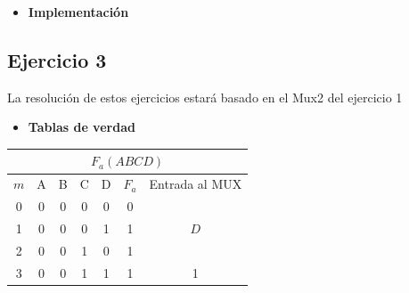 \begin{itemize}[nosep]\item\textbf{Implementación}\end{itemize}
\newpage
\subsection{Ejercicio 3}
\sangria{} La resolución de estos ejercicios estará basado en el Mux2 del ejercicio 1
\begin{itemize}[nosep]\item\textbf{Tablas de verdad}\end{itemize}
\begin{center}
    \begin{minipage}[t]{0.45\textwidth}\centering
        \begin{tabular}{ccccccc}
\multicolumn{7}{c}{\cellcolor[HTML]{FFFFC7}$F_a(ABCD)$}                                                                                                                                                                                                                       \\ \hline
\multicolumn{1}{c|}{\cellcolor[HTML]{9AFF99}$m$} & \cellcolor[HTML]{ECF4FF}A & \cellcolor[HTML]{ECF4FF}B & \cellcolor[HTML]{ECF4FF}C & \multicolumn{1}{c|}{\cellcolor[HTML]{ECF4FF}D} & \multicolumn{1}{c|}{\cellcolor[HTML]{FFCCC9}$F_a$} & Entrada al MUX                   \\ \hline
\multicolumn{1}{c|}{0}                           & 0                         & 0                         & 0                         & \multicolumn{1}{c|}{0}                         & \multicolumn{1}{c|}{0}                             &                                  \\
\multicolumn{1}{c|}{1}                           & 0                         & 0                         & 0                         & \multicolumn{1}{c|}{1}                         & \multicolumn{1}{c|}{1}                             & \multirow{-2}{*}{$D$}            \\ \hline
\multicolumn{1}{c|}{2}                           & 0                         & 0                         & 1                         & \multicolumn{1}{c|}{0}                         & \multicolumn{1}{c|}{1}                             &                                  \\
\multicolumn{1}{c|}{3}                           & 0                         & 0                         & 1                         & \multicolumn{1}{c|}{1}                         & \multicolumn{1}{c|}{1}                             & \multirow{-2}{*}{1}              \\ \hline

\end{tabular}
\end{minipage}
\end{center}
